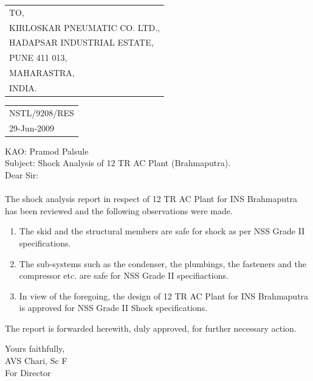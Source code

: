 \documentclass[11pt]{article}
\begin{document}
\thispagestyle{empty}
\vspace*{1cm}	
\begin{flushleft}
{\small{
\begin{tabular}{l}
TO, \\
KIRLOSKAR PNEUMATIC CO. LTD.,   \\
HADAPSAR INDUSTRIAL ESTATE, \\ 
PUNE 411 013, \\
MAHARASTRA,\\
INDIA. \\
\end{tabular}
}}
\end{flushleft}
\vspace*{-3.4cm}
\begin{flushright}
\begin{tabular}{l}
NSTL/9208/RES \\
29-Jun-2009\\
\end{tabular}
\end{flushright}
\vspace*{2.5cm}
\large
\noindent  KAO: Pramod Palsule\\

\noindent Subject: Shock Analysis of 12 TR  AC Plant (Brahmaputra).\\

\noindent Dear Sir: \\ \\
 The shock analysis report in respect of 12 TR AC Plant for INS Brahmaputra has been reviewed and the following observations were made.
 \begin{enumerate}
 \item The skid and the structural members are safe for shock as per NSS Grade II specifications.
 \item The sub-systems such as the condenser, the plumbings, the fasteners and the compressor etc. are safe for NSS Grade II specifiactions.
 \item In view of the foregoing, the  design of 12 TR AC Plant for INS Brahmaputra is approved for NSS Grade II Shock specifications.
 \end{enumerate}
 The report is forwarded herewith, duly approved, for further necessary action.

\vspace*{1.5cm}
\noindent Yours faithfully,\\

\vspace*{0.75cm}
\noindent AVS Chari, Sc F\\
\noindent For Director
\end{document}
